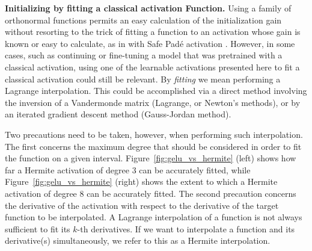 \documentclass{article} %
\theoremstyle{plain}
\theoremstyle{definition}
\theoremstyle{remark}
\begin{document}
\textbf{Initializing by fitting a classical activation Function.}\label{sec:finetuning}
Using a family of orthonormal functions permits an easy calculation of the initialization gain without resorting to the trick of fitting a function to an activation whose gain is known or easy to calculate, as in \cite{yang2025kolmogorovarnold} with Safe Padé activation \cite{Molina2020Padé}.
However, in some cases, such as continuing or fine-tuning a model that was pretrained with a classical activation, using one of the learnable activations presented here to fit a classical activation could still be relevant. By \emph{fitting} we mean performing a Lagrange interpolation. This could be accomplished via a direct method involving the inversion of a Vandermonde matrix (Lagrange, or Newton's methods), or by an iterated gradient descent method (Gauss-Jordan method).

Two precautions need to be taken, however, when performing such interpolation. The first concerns the maximum degree that should be considered in order to fit the function on a given interval. Figure~\ref{fig:gelu_vs_hermite} (left) shows how far a Hermite activation of degree 3 can be accurately fitted, while Figure~\ref {fig:gelu_vs_hermite} (right) shows the extent to which a Hermite activation of degree 8 can be accurately fitted. The second precaution concerns the derivative of the activation with respect to the derivative of the target function to be interpolated. A Lagrange interpolation of a function is not always sufficient to fit its $k$-th derivatives. If we want to interpolate a function and its derivative(s) simultaneously, we refer to this as a Hermite interpolation. 
\end{document}
